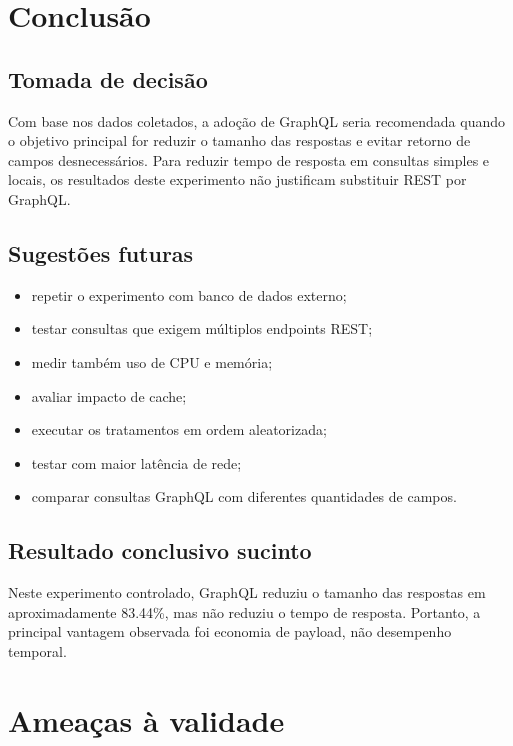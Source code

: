 \documentclass[12pt,a4paper]{article}
\begin{document}
\section{Conclusão}

\subsection{Tomada de decisão}

Com base nos dados coletados, a adoção de GraphQL seria recomendada quando o objetivo principal for reduzir o tamanho das respostas e evitar retorno de campos desnecessários. Para reduzir tempo de resposta em consultas simples e locais, os resultados deste experimento não justificam substituir REST por GraphQL.

\subsection{Sugestões futuras}

\begin{itemize}
  \item repetir o experimento com banco de dados externo;
  \item testar consultas que exigem múltiplos endpoints REST;
  \item medir também uso de CPU e memória;
  \item avaliar impacto de cache;
  \item executar os tratamentos em ordem aleatorizada;
  \item testar com maior latência de rede;
  \item comparar consultas GraphQL com diferentes quantidades de campos.
\end{itemize}

\subsection{Resultado conclusivo sucinto}

Neste experimento controlado, GraphQL reduziu o tamanho das respostas em aproximadamente 83.44\%, mas não reduziu o tempo de resposta. Portanto, a principal vantagem observada foi economia de payload, não desempenho temporal.

\section{Ameaças à validade}
\end{document}
